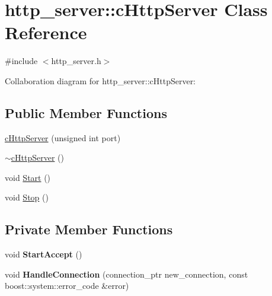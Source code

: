 \hypertarget{classhttp__server_1_1cHttpServer}{\section{http\-\_\-server\-:\-:c\-Http\-Server Class Reference}
\label{classhttp__server_1_1cHttpServer}
}


{\ttfamily \#include $<$http\-\_\-server.\-h$>$}



Collaboration diagram for http\-\_\-server\-:\-:c\-Http\-Server\-:
\subsection*{Public Member Functions}
\begin{DoxyCompactItemize}
\item 
\hyperlink{classhttp__server_1_1cHttpServer_a26d917897dda50502ea1469fb5af9c2e}{c\-Http\-Server} (unsigned int port)
\item 
\hyperlink{classhttp__server_1_1cHttpServer_a783dd5b31b19b8a95e6c2ce7c188a7c9}{$\sim$c\-Http\-Server} ()
\item 
void \hyperlink{classhttp__server_1_1cHttpServer_ad4699b20627615aee961a06eae97fb89}{Start} ()
\item 
void \hyperlink{classhttp__server_1_1cHttpServer_a2c7bcb8fb8ca1aa5fe26d00c94c11835}{Stop} ()
\end{DoxyCompactItemize}
\subsection*{Private Member Functions}
\begin{DoxyCompactItemize}
\item 
\hypertarget{classhttp__server_1_1cHttpServer_abec1513422a3b70b8c3684f4dc8c6271}{void {\bfseries Start\-Accept} ()}\label{classhttp__server_1_1cHttpServer_abec1513422a3b70b8c3684f4dc8c6271}

\item 
\hypertarget{classhttp__server_1_1cHttpServer_adfe4c5b575c0e94174a64d228f152d46}{void {\bfseries Handle\-Connection} (connection\-\_\-ptr new\-\_\-connection, const boost\-::system\-::error\-\_\-code \&error)}\label{classhttp__server_1_1cHttpServer_adfe4c5b575c0e94174a64d228f152d46}

\end{DoxyCompactItemize}
